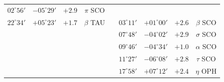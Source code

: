 \begin{table}[!h]
{\begin{tabular}{ccccccccc}
$02^\circ 56'$ & $ -05^\circ 29'$  & $+2.9$ &  $\pi$      SCO\\
$22^\circ 34'$ &  $+05^\circ 23'$ &  $+1.7$ & $\beta$    TAU &&
$03^\circ 11'$  & $+01^\circ 00'$ &  $+2.6$ &$\beta$  SCO\\
&&&&&
$07^\circ 48'$ &  $-04^\circ 02'$ &  $+2.9$ &  $\sigma$   SCO\\&&&&&
$09^\circ 46'$ &   $-04^\circ 34'$ &  $+1.0$ &   $\alpha$   SCO\\&&&&&
$11^\circ 27'$ &   $-06^\circ 08'$ &   $+2.8$ &  $\tau$     SCO\\&&&&&
$17^\circ 58'$ &  $+07^\circ 12'$ &  $+2.4$ &  $\eta$     OPH\\
\end{tabular}}
\end{table}

\clearpage
